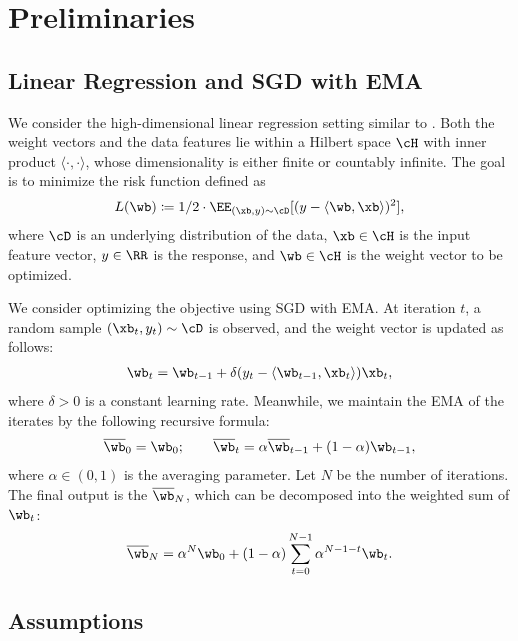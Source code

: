 \documentclass[11pt]{article}
\newcommand{\owb}{\overline{\wb}}
\begin{document}
\section{Preliminaries}




\subsection{Linear Regression and SGD with EMA}

We consider the high-dimensional linear regression setting similar to \citet{zou2021benign}.
Both the weight vectors and the data features lie within a Hilbert space $\cH$ with inner product $\langle\cdot, \cdot\rangle$, whose dimensionality is either finite or countably infinite.
The goal is to minimize the risk function defined as
\begin{align*}
L(\wb)\coloneqq1/2\cdot\EE_{(\xb, y)\sim\cD}[(y-\langle\wb, \xb\rangle)^2],
\end{align*}
where $\cD$ is an underlying distribution of the data, $\xb\in\cH$ is the input feature vector, $y\in\RR$ is the response, and $\wb\in\cH$ is the weight vector to be optimized.

We consider optimizing the objective using SGD with EMA.
At iteration $t$, a random sample $(\xb_t, y_t)\sim\cD$ is observed, and the weight vector is updated as follows:
\begin{align*}
\wb_t=\wb_{t-1}+\delta(y_t-\langle\wb_{t-1}, \xb_t\rangle)\xb_t,
\end{align*}
where $\delta>0$ is a constant learning rate. Meanwhile, we maintain the EMA of the iterates by the following recursive formula:
\begin{align}\label{eq:def_EMA}
\owb_0=\wb_0;\qquad\owb_t=\alpha\owb_{t-1}+(1-\alpha)\wb_{t-1},
\end{align}
where $\alpha\in(0, 1)$ is the averaging parameter.
Let $N$ be the number of iterations. The final output is the $\owb_N$, which can be decomposed into the weighted sum of $\wb_t$:
\begin{align}\label{eq:weighted_sum}
\owb_N=\alpha^N\wb_0+(1-\alpha)\sum_{t=0}^{N-1}\alpha^{N-1-t}\wb_t.
\end{align}

\subsection{Assumptions}
\end{document}
